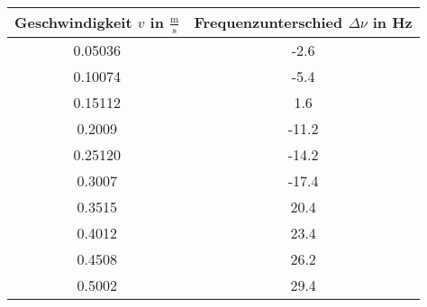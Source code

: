 \begin{center}
\begin{tabular}{c|c}
	Geschwindigkeit $v$ in $\frac{\text{m}}{\text{s}}$ & Frequenzunterschied $\Delta\nu$ in Hz\\
	\hline
	0.05036 & -2.6 \\
	0.10074 & -5.4 \\
	0.15112 & 1.6 \\
	0.2009 & -11.2 \\
	0.25120 & -14.2 \\
	0.3007 & -17.4 \\
	0.3515 & 20.4 \\
	0.4012 & 23.4 \\
	0.4508 & 26.2 \\
	0.5002 & 29.4 \\
\end{tabular}
\end{center}
